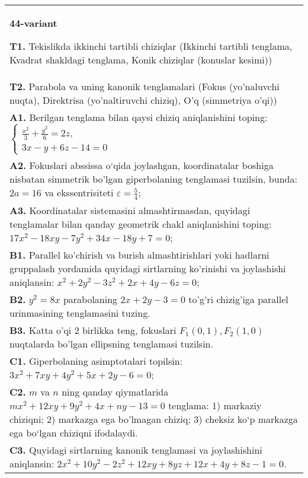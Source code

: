 \documentclass{article}
\begin{document}
\begin{tabular}{m{17cm}}
\textbf{44-variant}
\newline

\textbf{T1.} Tekislikda ikkinchi tartibli chiziqlar (Ikkinchi tartibli tenglama, Kvadrat shakldagi tenglama, Konik chiziqlar (konuslar kesimi)) \\
\textbf{T2.} Parabola va uning kanonik tenglamalari (Fokus (yo’naluvchi nuqta), Direktrisa (yo’naltiruvchi chiziq), O’q (simmetriya o’qi)) \\
\textbf{A1.} Berilgan tenglama bilan qaysi chiziq aniqlanishini toping: $\left\{\begin{array}{l}\frac{x^2}{3}+\frac{y^2}{6}=2 z, \\ 3 x-y+6 z-14=0\end{array}\right.$ \\
\textbf{A2.} Fokuslari abssissa o‘qida joylashgan, koordinatalar boshiga nisbatan simmetrik bo'lgan giperbolaning tenglamasi tuzilsin, bunda: $2 a=16$ va ekssentrisiteti $\varepsilon=\frac{5}{4}$; \\
\textbf{A3.} Koordinatalar sistemasini almashtirmasdan, quyidagi tenglamalar bilan qanday geometrik chakl aniqlanishini toping: $17 x^2-18 x y-7 y^2+34 x-18 y+7=0$; \\
\textbf{B1.} Parallel ko'chirish va burish almashtirishlari yoki hadlarni gruppalash yordamida quyidagi sirtlarning ko'rinishi va joylashishi aniqlansin: $x^2+2 y^2-3 z^2+2 x+4 y-6 z=0$; \\
\textbf{B2.} $y^2=8x$ parabolaning $2x+2y-3=0$ to'g'ri chizig'iga parallel urinmasining tenglamasini tuzing. \\
\textbf{B3.} Katta o'qi 2 birlikka teng, fokuslari $F_1(0,1), F_2(1,0)$ nuqtalarda bo'lgan ellipsning tenglamasi tuzilsin. \\
\textbf{C1.} Giperbolaning asimptotalari topilsin: $3 x^2+7 x y+4 y^2+5 x+2 y-6=0$; \\
\textbf{C2.} $m$ va $n$ ning qanday qiymatlarida $m x^2+12 x y+9 y^2+4 x+n y-13=0$ tenglama: 1) markaziy chiziqni; 2) markazga ega bo'lmagan chiziq; 3) cheksiz ko‘p markazga ega bo‘lgan chiziqni ifodalaydi. \\
\textbf{C3.} Quyidagi sirtlarning kanonik tenglamasi va joylashishini aniqlansin: $2 x^2+10 y^2-2 z^2+12 x y+8 y z+12 x+4 y+8 z-1=0$. \\

\end{tabular}
\vspace{1cm}
\end{document}
